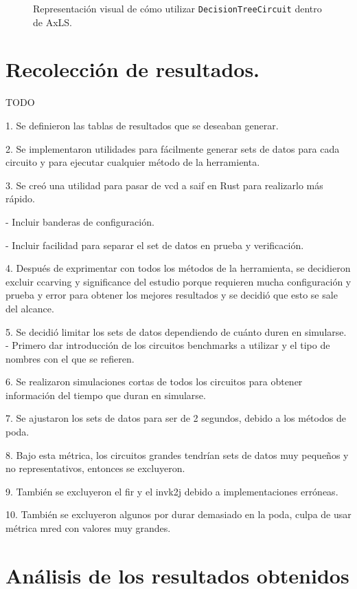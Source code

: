 \begin{figure}[htb]
  \centering
  
  \caption{Representación visual de cómo utilizar \texttt{DecisionTreeCircuit} dentro de AxLS.}
  \label{fig:flow}
\end{figure}

\section{Recolección de resultados.}

 TODO

 1. Se definieron las tablas de resultados que se deseaban generar.

 2. Se implementaron utilidades para fácilmente generar sets de datos para cada circuito y para ejecutar cualquier método de la herramienta.

 3. Se creó una utilidad para pasar de vcd a saif en Rust para realizarlo más rápido.

   - Incluir banderas de configuración.

   - Incluir facilidad para separar el set de datos en prueba y verificación.

 4. Después de exprimentar con todos los métodos de la herramienta, se
 decidieron excluir ccarving y significance del estudio porque requieren mucha
 configuración y prueba y error para obtener los mejores resultados y se decidió
 que esto se sale del alcance.

 5. Se decidió limitar los sets de datos dependiendo de cuánto duren en simularse.
   - Primero dar introducción de los circuitos benchmarks a utilizar y el tipo de nombres con el que se refieren.

 6. Se realizaron simulaciones cortas de todos los circuitos para obtener información del tiempo que duran en simularse.

 7. Se ajustaron los sets de datos para ser de 2 segundos, debido a los métodos de poda.

 8. Bajo esta métrica, los circuitos grandes tendrían sets de datos muy pequeños y no representativos, entonces se excluyeron.

 9. También se excluyeron el fir y el invk2j debido a implementaciones erróneas.

 10. También se excluyeron algunos por durar demasiado en la poda, culpa de usar métrica mred con valores muy grandes.

\section{Análisis de los resultados obtenidos}

